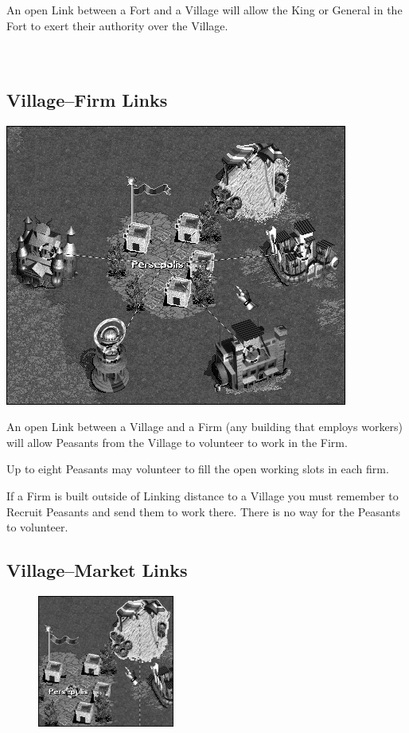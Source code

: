 An open Link between a Fort and a Village will allow the King or General in the Fort to exert their authority over the Village. \\ \\ \\

\subsection{Village–Firm Links}

\begin{center}
	\includegraphics[width=0.7\linewidth]{Imultilinks}
\end{center}

An open Link between a Village and a Firm (any building that employs workers) will allow Peasants from the Village to volunteer to work in the Firm.

Up to eight Peasants may volunteer to fill the open working slots in each firm.

If a Firm is built outside of Linking distance to a Village you must remember to Recruit Peasants and send them to work there. There is no way for the Peasants to volunteer.

\clearpage

\subsection{Village–Market Links}

\begin{figure}
	\vspace{-20pt}
	\begin{center}
		\includegraphics[width=0.4\textwidth]{Ilink_villagemarket}
	\end{center}
	\vspace{-20pt}
	\vspace{-10pt}
\end{figure}


